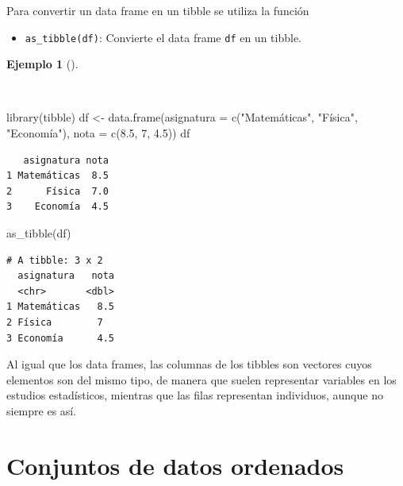 \documentclass[
  a4paper,
]{scrreport}
\newenvironment{Shaded}{\begin{snugshade}}{\end{snugshade}}
\newcommand{\AttributeTok}[1]{\textcolor[rgb]{0.40,0.45,0.13}{#1}}
\newcommand{\DecValTok}[1]{\textcolor[rgb]{0.68,0.00,0.00}{#1}}
\newcommand{\FloatTok}[1]{\textcolor[rgb]{0.68,0.00,0.00}{#1}}
\newcommand{\FunctionTok}[1]{\textcolor[rgb]{0.28,0.35,0.67}{#1}}
\newcommand{\NormalTok}[1]{\textcolor[rgb]{0.00,0.23,0.31}{#1}}
\newcommand{\OtherTok}[1]{\textcolor[rgb]{0.00,0.23,0.31}{#1}}
\newcommand{\StringTok}[1]{\textcolor[rgb]{0.13,0.47,0.30}{#1}}
\providecommand{\tightlist}{%
  \setlength{\itemsep}{0pt}\setlength{\parskip}{0pt}}\usepackage{longtable,booktabs,array}
\theoremstyle{definition}
\theoremstyle{definition}
\newtheorem{example}{Ejemplo}[chapter]
\theoremstyle{remark}
\begin{document}
Para convertir un data frame en un tibble se utiliza la función

\begin{itemize}
\tightlist
\item
  \texttt{as\_tibble(df)}: Convierte el data frame \texttt{df} en un
  tibble.
\end{itemize}

\begin{example}[]\protect\hypertarget{exm-creacion-tibble}{}\label{exm-creacion-tibble}

~

\begin{Shaded}
\begin{Highlighting}[]
\FunctionTok{library}\NormalTok{(tibble)}
\NormalTok{df }\OtherTok{\textless{}{-}} \FunctionTok{data.frame}\NormalTok{(}\AttributeTok{asignatura =} \FunctionTok{c}\NormalTok{(}\StringTok{"Matemáticas"}\NormalTok{, }\StringTok{"Física"}\NormalTok{, }\StringTok{"Economía"}\NormalTok{), }\AttributeTok{nota =} \FunctionTok{c}\NormalTok{(}\FloatTok{8.5}\NormalTok{, }\DecValTok{7}\NormalTok{, }\FloatTok{4.5}\NormalTok{))}
\NormalTok{df}
\end{Highlighting}
\end{Shaded}

\begin{verbatim}
   asignatura nota
1 Matemáticas  8.5
2      Física  7.0
3    Economía  4.5
\end{verbatim}

\begin{Shaded}
\begin{Highlighting}[]
\FunctionTok{as\_tibble}\NormalTok{(df)}
\end{Highlighting}
\end{Shaded}

\begin{verbatim}
# A tibble: 3 x 2
  asignatura   nota
  <chr>       <dbl>
1 Matemáticas   8.5
2 Física        7  
3 Economía      4.5
\end{verbatim}

\end{example}

Al igual que los data frames, las columnas de los tibbles son vectores
cuyos elementos son del mismo tipo, de manera que suelen representar
variables en los estudios estadísticos, mientras que las filas
representan individuos, aunque no siempre es así.

\section{Conjuntos de datos
ordenados}\label{conjuntos-de-datos-ordenados}
\end{document}
